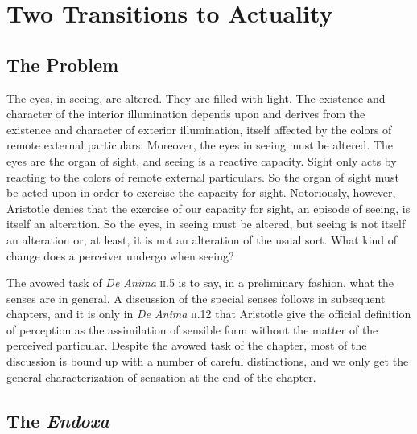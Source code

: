 \chapter{Two Transitions to Actuality} %
\label{cha:two_kinds_of_potentiality}

\section{The Problem} %
\label{sec:the_problem}

The eyes, in seeing, are altered. They are filled with light. The existence and character of the interior illumination depends upon and derives from the existence and character of exterior illumination, itself affected by the colors of remote external particulars. Moreover, the eyes in seeing must be altered. The eyes are the organ of sight, and seeing is a reactive capacity. Sight only acts by reacting to the colors of remote external particulars. So the organ of sight must be acted upon in order to exercise the capacity for sight. Notoriously, however, Aristotle denies that the exercise of our capacity for sight, an episode of seeing, is itself an alteration. So the eyes, in seeing must be altered, but seeing is not itself an alteration or, at least, it is not an alteration of the usual sort. What kind of change does a perceiver undergo when seeing? 

The avowed task of \emph{De Anima} \textsc{ii}.5 is to say, in a preliminary fashion, what the senses are in general. A discussion of the special senses follows in subsequent chapters, and it is only in \emph{De Anima} \textsc{ii}.12 that Aristotle give the official definition of perception as the assimilation of sensible form without the matter of the perceived particular. Despite the avowed task of the chapter, most of the discussion is bound up with a number of careful distinctions, and we only get the general characterization of sensation at the end of the chapter. 


\section{The \emph{Endoxa}} %
\label{sec:the_endoxa}


